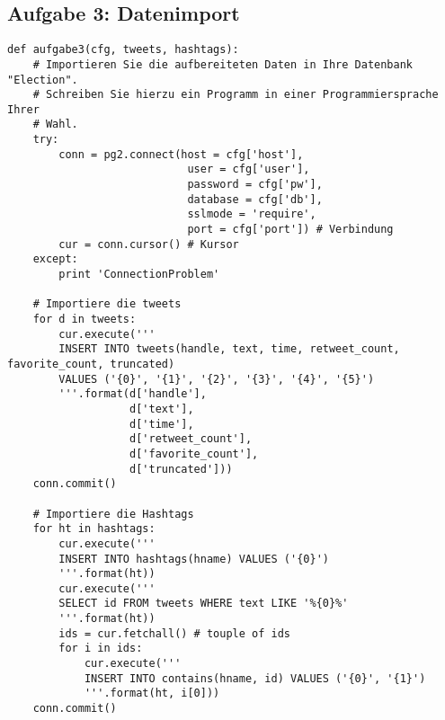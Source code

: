 \documentclass[a4paper]{article}
\begin{document}
\subsection{Aufgabe 3: Datenimport}
\begin{verbatim}
def aufgabe3(cfg, tweets, hashtags):
    # Importieren Sie die aufbereiteten Daten in Ihre Datenbank "Election".
    # Schreiben Sie hierzu ein Programm in einer Programmiersprache Ihrer
    # Wahl.
    try:
        conn = pg2.connect(host = cfg['host'],
                            user = cfg['user'],
                            password = cfg['pw'],
                            database = cfg['db'],
                            sslmode = 'require',
                            port = cfg['port']) # Verbindung
        cur = conn.cursor() # Kursor
    except:
        print 'ConnectionProblem'

    # Importiere die tweets
    for d in tweets:
        cur.execute('''
        INSERT INTO tweets(handle, text, time, retweet_count, favorite_count, truncated)
        VALUES ('{0}', '{1}', '{2}', '{3}', '{4}', '{5}')
        '''.format(d['handle'],
                   d['text'],
                   d['time'],
                   d['retweet_count'],
                   d['favorite_count'],
                   d['truncated']))
    conn.commit()

    # Importiere die Hashtags
    for ht in hashtags:
        cur.execute('''
        INSERT INTO hashtags(hname) VALUES ('{0}')
        '''.format(ht))
        cur.execute('''
        SELECT id FROM tweets WHERE text LIKE '%{0}%'
        '''.format(ht))
        ids = cur.fetchall() # touple of ids
        for i in ids:
            cur.execute('''
            INSERT INTO contains(hname, id) VALUES ('{0}', '{1}')
            '''.format(ht, i[0]))
    conn.commit()
\end{verbatim}
\end{document}
